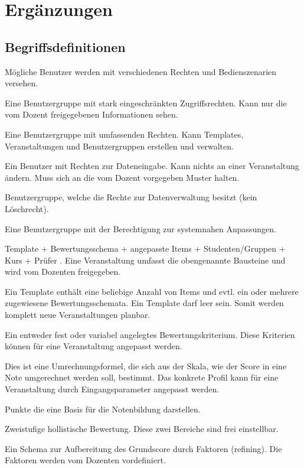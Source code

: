 	\section{Ergänzungen}
		
	
	
 \begin{appendix}
  \section{Begriffsdefinitionen}
	\begin{description}
	\item[Benutzergruppen] Mögliche Benutzer werden mit verschiedenen Rechten und Bedienszenarien versehen.
	\item[Student] Eine Benutzergruppe mit stark eingeschränkten Zugriffsrechten. Kann nur die vom Dozent freigegebenen Informationen sehen.
	\item[Dozent] Eine Benutzergruppe mit umfassenden Rechten. Kann Templates, Veranstaltungen und Benutzergruppen erstellen und verwalten.
	\item[Prüfer] Ein Benutzer mit Rechten zur Dateneingabe. Kann nichts an einer Veranstaltung ändern. Muss sich an die vom Dozent vorgegeben Muster halten.
	\item[Sekretariat] Benutzergruppe, welche die Rechte zur Datenverwaltung besitzt (kein Löschrecht).
	\item[Administrator] Eine Benutzergruppe mit der Berechtigung zur systemnahen Anpassungen.
	\item[Veranstaltung] Template + Bewertungsschema + angepasste Items + Studenten/Gruppen + Kurs + Prüfer . Eine Veranstaltung umfasst die obengenannte Bausteine und wird vom Dozenten freigegeben. 
	\item[Template] Ein Template enthält eine beliebige Anzahl von Items und evtl. ein oder mehrere zugewiesene Bewertungsschemata. Ein Template darf leer sein. Somit werden komplett neue Veranstaltungen planbar.
	\item[Item] Ein entweder fest oder variabel angelegtes Bewertungskriterium. Diese Kriterien können für eine Veranstaltung angepasst werden.
	\item[{\parbox[t]{0.2\linewidth}{Notenkonvertierungsprofil \\ (S$_2$G)}}] {\parbox[t]{\linewidth}{ Dies ist eine Umrechnungsformel, die sich aus der Skala, wie der Score in eine Note umgerechnet werden soll, bestimmt. Das konkrete Profil kann für eine Veranstaltung durch Eingangsparameter angepasst werden.}}
	\item[Score] Punkte die eine Basis für die Notenbildung darstellen.
	\item[Grundscore (H$_2$)]  Zweistufige hollistische Bewertung. Diese zwei Bereiche sind frei einstellbar.
	\item[Score Refining (S$_2$R)]  Ein Schema zur Aufbereitung des Grundscore durch Faktoren (refining). Die Faktoren werden vom Dozenten vordefiniert.
	

\end{description}
\end{appendix}
